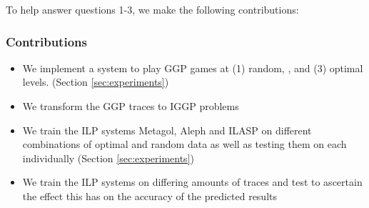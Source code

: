 To help answer questions 1-3, we make the following contributions:

\subsubsection{Contributions}
\begin{itemize}
\item We implement a system to play GGP games at (1) random, , and (3) optimal levels. (Section \ref{sec:experiments})
\item We transform the GGP traces to IGGP problems
\item We train the ILP systems Metagol, Aleph and ILASP on different combinations of optimal and random data as well as testing them on each individually (Section \ref{sec:experiments})
\item We train the ILP systems on differing amounts of traces and test to ascertain the effect this has on the accuracy of the predicted results
\end{itemize}